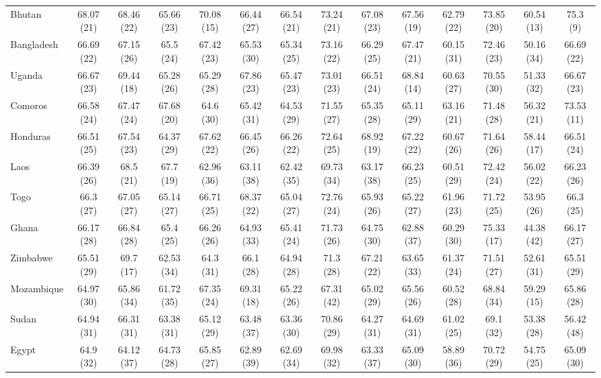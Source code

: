 \begin{landscape}
{\begin{longtable}{lccccccccccccc}
Bhutan & 68.07 (21) & 68.46 (22) & 65.66 (23) & 70.08 (15) & 66.44 (27) & 66.54 (21) & 73.24 (21) & 67.08 (23) & 67.56 (19) & 62.79 (22) & 73.85 (20) & 60.54 (13) & 75.3 (9) \\ 
Bangladesh & 66.69 (22) & 67.15 (26) & 65.5 (24) & 67.42 (23) & 65.53 (30) & 65.34 (25) & 73.16 (22) & 66.29 (25) & 67.47 (21) & 60.15 (31) & 72.46 (23) & 50.16 (34) & 66.69 (22) \\ 
Uganda & 66.67 (23) & 69.44 (18) & 65.28 (26) & 65.29 (28) & 67.86 (23) & 65.47 (23) & 73.01 (23) & 66.51 (24) & 68.84 (14) & 60.63 (27) & 70.55 (30) & 51.33 (32) & 66.67 (23) \\ 
Comoros & 66.58 (24) & 67.47 (24) & 67.68 (20) & 64.6 (30) & 65.42 (31) & 64.53 (29) & 71.55 (27) & 65.35 (28) & 65.11 (29) & 63.16 (21) & 71.48 (28) & 56.32 (21) & 73.53 (11) \\ 
Honduras & 66.51 (25) & 67.54 (23) & 64.37 (29) & 67.62 (22) & 66.45 (26) & 66.26 (22) & 72.64 (25) & 68.92 (19) & 67.22 (22) & 60.67 (26) & 71.64 (26) & 58.44 (17) & 66.51 (24) \\ 
Laos & 66.39 (26) & 68.5 (21) & 67.7 (19) & 62.96 (36) & 63.11 (38) & 62.42 (35) & 69.73 (34) & 63.17 (38) & 66.23 (25) & 60.51 (29) & 72.42 (24) & 56.02 (22) & 66.23 (26) \\ 
Togo & 66.3 (27) & 67.05 (27) & 65.14 (27) & 66.71 (25) & 68.37 (22) & 65.04 (27) & 72.76 (24) & 65.93 (26) & 65.22 (27) & 61.96 (23) & 71.72 (25) & 53.95 (26) & 66.3 (25) \\ 
Ghana & 66.17 (28) & 66.84 (28) & 65.4 (25) & 66.26 (26) & 64.93 (33) & 65.41 (24) & 71.73 (26) & 64.75 (30) & 62.88 (37) & 60.29 (30) & 75.33 (17) & 44.38 (42) & 66.17 (27) \\ 
Zimbabwe & 65.51 (29) & 69.7 (17) & 62.53 (34) & 64.3 (31) & 66.1 (28) & 64.94 (28) & 71.3 (28) & 67.21 (22) & 63.65 (33) & 61.37 (24) & 71.51 (27) & 52.61 (31) & 65.51 (29) \\ 
Mozambique & 64.97 (30) & 65.86 (34) & 61.72 (35) & 67.35 (24) & 69.31 (18) & 65.22 (26) & 67.31 (42) & 65.02 (29) & 65.56 (26) & 60.52 (28) & 68.84 (34) & 59.29 (15) & 65.86 (28) \\ 
Sudan & 64.94 (31) & 66.31 (31) & 63.38 (31) & 65.12 (29) & 63.48 (37) & 63.36 (30) & 70.86 (29) & 64.27 (31) & 64.69 (31) & 61.02 (25) & 69.1 (32) & 53.38 (28) & 56.42 (48) \\ 
Egypt & 64.9 (32) & 64.12 (37) & 64.73 (28) & 65.85 (27) & 62.89 (39) & 62.69 (34) & 69.98 (32) & 63.33 (37) & 65.09 (30) & 58.89 (36) & 70.72 (29) & 54.75 (25) & 65.09 (30) \\ 

\end{longtable}}
\end{landscape}
